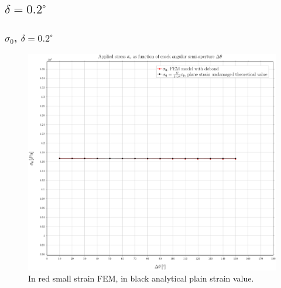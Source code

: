 \documentclass[first,firstsupp,lastsupp,handout,last,hyperref,table]{ETHclass}
\begin{document}


\subsection{$\delta=0.2^{\circ}$}

\begin{frame}
\frametitle{\small $\sigma_{0}$, $\delta=0.2^{\circ}$}
\vspace{-0.5cm}
\centering
\captionsetup[figure]{font=scriptsize,labelfont=scriptsize}
\begin{figure}[!h]
\centering
\includegraphics[height=0.7\textheight]{2017-07-10_AbqRunSummary_SmallStrainD02_sigma-inf_Summary.pdf}
  \caption{\scriptsize In red small strain FEM, in black analytical plain strain value.}
  \label{fig:res1}
\end{figure}
\end{frame}
\end{document}
